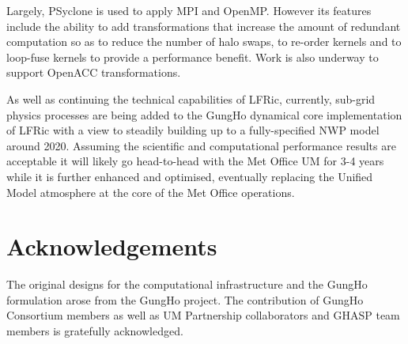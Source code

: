 \documentclass[review,times]{elsarticle}
\begin{document}
Largely, PSyclone is used to apply MPI and OpenMP. However its
features include the ability to add transformations that increase the
amount of redundant computation so as to reduce the number of halo
swaps, to re-order kernels and to loop-fuse kernels to provide a
performance benefit. Work is also underway to support OpenACC
transformations.

As well as continuing the technical capabilities of LFRic, currently,
sub-grid physics processes are being added to the GungHo dynamical
core implementation of LFRic with a view to steadily building up to a
fully-specified NWP model around 2020. Assuming the scientific and
computational performance results are acceptable it will likely go
head-to-head with the Met Office UM for 3-4 years while it is further
enhanced and optimised, eventually replacing the Unified Model
atmosphere at the core of the Met Office operations.

\section*{Acknowledgements}
The original designs for the computational infrastructure and the GungHo
formulation arose from the GungHo project. The contribution of GungHo
Consortium members as well as UM Partnership collaborators and GHASP team
members is gratefully acknowledged. 

\newpage


\end{document}
